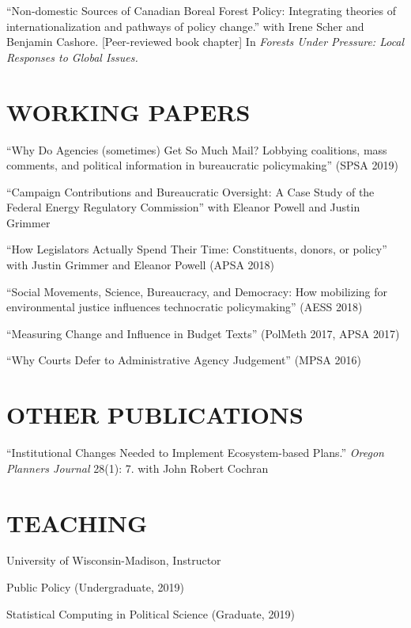 \documentclass[11pt,]{article}
\renewenvironment{itemize}{
  \begin{list}{}{
    \setlength{\leftmargin}{1.5em}
  }
}{
  \end{list}
}
\begin{document}
``Non-domestic Sources of Canadian Boreal Forest Policy: Integrating
theories of internationalization and pathways of policy change.'' with
Irene Scher and Benjamin Cashore. {[}Peer-reviewed book chapter{]} In
\emph{Forests Under Pressure: Local Responses to Global Issues.}

\hypertarget{working-papers}{%
\section{WORKING PAPERS}\label{working-papers}}

``Why Do Agencies (sometimes) Get So Much Mail? Lobbying coalitions,
mass comments, and political information in bureaucratic policymaking''
(SPSA 2019)

``Campaign Contributions and Bureaucratic Oversight: A Case Study of the
Federal Energy Regulatory Commission'' with Eleanor Powell and Justin
Grimmer

``How Legislators Actually Spend Their Time: Constituents, donors, or
policy'' with Justin Grimmer and Eleanor Powell (APSA 2018)

``Social Movements, Science, Bureaucracy, and Democracy: How mobilizing
for environmental justice influences technocratic policymaking'' (AESS
2018)

``Measuring Change and Influence in Budget Texts'' (PolMeth 2017, APSA
2017)

``Why Courts Defer to Administrative Agency Judgement'' (MPSA 2016)

\hypertarget{other-publications}{%
\section{OTHER PUBLICATIONS}\label{other-publications}}

``Institutional Changes Needed to Implement Ecosystem-based Plans.''
\emph{Oregon Planners Journal} 28(1): 7. with John Robert Cochran

\hypertarget{teaching}{%
\section{TEACHING}\label{teaching}}

University of Wisconsin-Madison, Instructor

\begin{itemize}
\item
  Public Policy (Undergraduate, 2019)
\item
  Statistical Computing in Political Science (Graduate, 2019)
\end{itemize}
\end{document}
